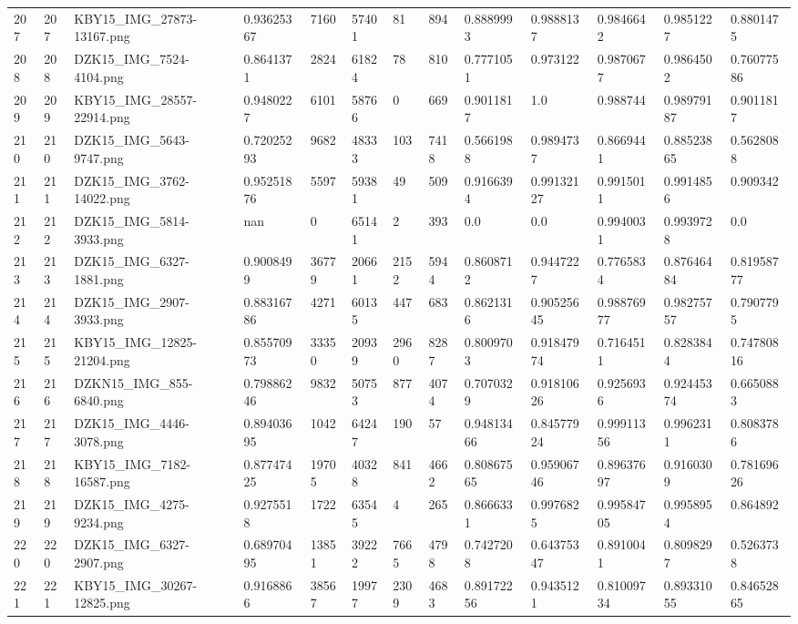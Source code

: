 \documentclass[11pt, a4paper, twoside]{report}
\begin{document}
\begin{longtable}[c]{@{}lllllllllllll@{}}
207 & 207 & KBY15\_IMG\_27873-13167.png & 0.93625367 & 7160 & 57401 & 81 & 894 & 0.8889993 & 0.9888137 & 0.9846642 & 0.9851227 & 0.8801475 \\
208 & 208 & DZK15\_IMG\_7524-4104.png & 0.8641371 & 2824 & 61824 & 78 & 810 & 0.7771051 & 0.973122 & 0.9870677 & 0.9864502 & 0.76077586 \\
209 & 209 & KBY15\_IMG\_28557-22914.png & 0.9480227 & 6101 & 58766 & 0 & 669 & 0.9011817 & 1.0 & 0.988744 & 0.98979187 & 0.9011817 \\
210 & 210 & DZK15\_IMG\_5643-9747.png & 0.72025293 & 9682 & 48333 & 103 & 7418 & 0.5661988 & 0.9894737 & 0.8669441 & 0.88523865 & 0.5628088 \\
211 & 211 & DZK15\_IMG\_3762-14022.png & 0.95251876 & 5597 & 59381 & 49 & 509 & 0.9166394 & 0.99132127 & 0.9915011 & 0.9914856 & 0.909342 \\
212 & 212 & DZK15\_IMG\_5814-3933.png & nan & 0 & 65141 & 2 & 393 & 0.0 & 0.0 & 0.9940031 & 0.9939728 & 0.0 \\
213 & 213 & DZK15\_IMG\_6327-1881.png & 0.9008499 & 36779 & 20661 & 2152 & 5944 & 0.8608712 & 0.9447227 & 0.7765834 & 0.87646484 & 0.81958777 \\
214 & 214 & DZK15\_IMG\_2907-3933.png & 0.88316786 & 4271 & 60135 & 447 & 683 & 0.8621316 & 0.90525645 & 0.98876977 & 0.98275757 & 0.7907795 \\
215 & 215 & KBY15\_IMG\_12825-21204.png & 0.85570973 & 33350 & 20939 & 2960 & 8287 & 0.8009703 & 0.91847974 & 0.7164511 & 0.8283844 & 0.74780816 \\
216 & 216 & DZKN15\_IMG\_855-6840.png & 0.79886246 & 9832 & 50753 & 877 & 4074 & 0.7070329 & 0.91810626 & 0.9256936 & 0.92445374 & 0.6650883 \\
217 & 217 & DZK15\_IMG\_4446-3078.png & 0.89403695 & 1042 & 64247 & 190 & 57 & 0.94813466 & 0.84577924 & 0.99911356 & 0.9962311 & 0.8083786 \\
218 & 218 & KBY15\_IMG\_7182-16587.png & 0.87747425 & 19705 & 40328 & 841 & 4662 & 0.80867565 & 0.95906746 & 0.89637697 & 0.9160309 & 0.78169626 \\
219 & 219 & DZK15\_IMG\_4275-9234.png & 0.9275518 & 1722 & 63545 & 4 & 265 & 0.8666331 & 0.9976825 & 0.99584705 & 0.9958954 & 0.864892 \\
220 & 220 & DZK15\_IMG\_6327-2907.png & 0.68970495 & 13851 & 39222 & 7665 & 4798 & 0.7427208 & 0.64375347 & 0.8910041 & 0.8098297 & 0.5263738 \\
221 & 221 & KBY15\_IMG\_30267-12825.png & 0.9168866 & 38567 & 19977 & 2309 & 4683 & 0.89172256 & 0.9435121 & 0.81009734 & 0.89331055 & 0.84652865 \\

\end{longtable}
\end{document}
